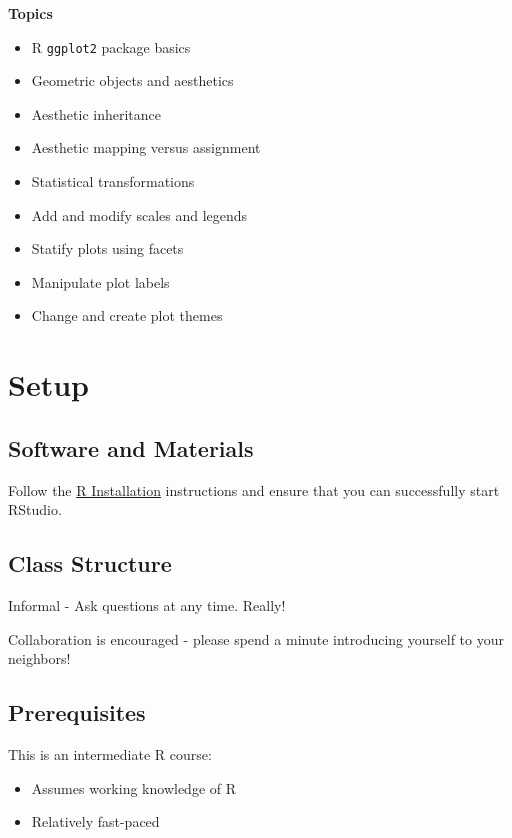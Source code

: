 \documentclass[
]{book}
\providecommand{\tightlist}{%
  \setlength{\itemsep}{0pt}\setlength{\parskip}{0pt}}
\begin{document}
\textbf{Topics}

\begin{itemize}
\tightlist
\item
  R \texttt{ggplot2} package basics
\item
  Geometric objects and aesthetics
\item
  Aesthetic inheritance
\item
  Aesthetic mapping versus assignment
\item
  Statistical transformations
\item
  Add and modify scales and legends
\item
  Statify plots using facets
\item
  Manipulate plot labels
\item
  Change and create plot themes
\end{itemize}

\hypertarget{setup-2}{%
\section{Setup}\label{setup-2}}

\hypertarget{software-and-materials-2}{%
\subsection{Software and Materials}\label{software-and-materials-2}}

Follow the \href{./Rinstall.html}{R Installation} instructions and ensure that you can successfully start RStudio.

\hypertarget{class-structure-2}{%
\subsection{Class Structure}\label{class-structure-2}}

Informal - Ask questions at any time. Really!

Collaboration is encouraged - please spend a minute introducing yourself to your neighbors!

\hypertarget{prerequisites-2}{%
\subsection{Prerequisites}\label{prerequisites-2}}

This is an intermediate R course:

\begin{itemize}
\tightlist
\item
  Assumes working knowledge of R
\item
  Relatively fast-paced
\end{itemize}
\end{document}
